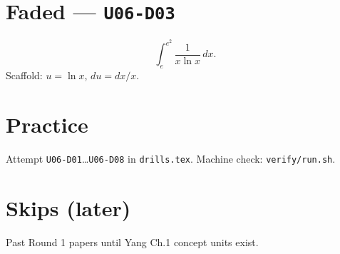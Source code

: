 \section{Faded --- \texttt{U06-D03}}
\[
\int_e^{e^2}\frac{1}{x\ln x}\,dx.
\]
Scaffold: $u=\ln x$, $du=dx/x$.


\section{Practice}
Attempt \texttt{U06-D01}\ldots\texttt{U06-D08} in \texttt{drills.tex}.
Machine check: \texttt{verify/run.sh}.

\section{Skips (later)}
Past Round 1 papers until Yang Ch.1 concept units exist.

